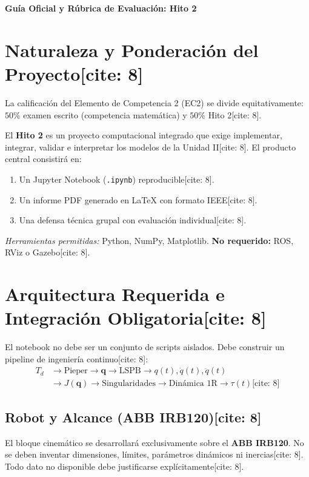 \documentclass[11pt, a4paper]{article}
\begin{document}
\begin{center}
    \Large\textbf{\textcolor{ucbblue}{Guía Oficial y Rúbrica de Evaluación: Hito 2}}\\[0.2cm]
\end{center}

\section{Naturaleza y Ponderación del Proyecto[cite: 8]}
La calificación del Elemento de Competencia 2 (EC2) se divide equitativamente: $50\%$ examen escrito (competencia matemática) y $50\%$ Hito 2[cite: 8]. 

El \textbf{Hito 2} es un proyecto computacional integrado que exige implementar, integrar, validar e interpretar los modelos de la Unidad II[cite: 8]. El producto central consistirá en:
\begin{enumerate}
    \item Un Jupyter Notebook (\texttt{.ipynb}) reproducible[cite: 8].
    \item Un informe PDF generado en LaTeX con formato IEEE[cite: 8].
    \item Una defensa técnica grupal con evaluación individual[cite: 8].
\end{enumerate}
\textit{Herramientas permitidas:} Python, NumPy, Matplotlib. \textbf{No requerido:} ROS, RViz o Gazebo[cite: 8].

\section{Arquitectura Requerida e Integración Obligatoria[cite: 8]}
El notebook no debe ser un conjunto de scripts aislados. Debe construir un pipeline de ingeniería continuo[cite: 8]:
\begin{align*}
    T_d &\to \text{Pieper} \to \mathbf{q} \to \text{LSPB} \to q(t), \dot{q}(t), \ddot{q}(t) \\
    &\to J(\mathbf{q}) \to \text{Singularidades} \to \text{Dinámica 1R} \to \tau(t) \text{[cite: 8]}
\end{align*}

\subsection{Robot y Alcance (ABB IRB120)[cite: 8]}
El bloque cinemático se desarrollará exclusivamente sobre el \textbf{ABB IRB120}. No se deben inventar dimensiones, límites, parámetros dinámicos ni inercias[cite: 8]. Todo dato no disponible debe justificarse explícitamente[cite: 8].
\end{document}
